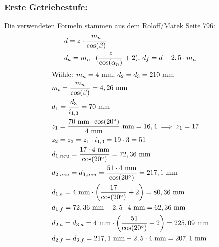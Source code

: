 \subsubsection{Erste Getriebestufe:}
Die verwendeten Formeln stammen aus dem Roloff/Matek Seite 796:
\begin{align*}
	&d= z \cdot \frac{m_n}{\cos(\beta)} \\
	&d_a = m_n \cdot (\frac{z}{\cos(\alpha_n)}+2)\text{, } d_f =d- 2,5 \cdot m_n
\end{align*}
\begin{align*}
	&\text{Wähle: } m_n= 4\text{ mm, } d_2 = d_3 = 210 \text{ mm} \\
	&m_t =  \frac{m_n}{\cos(\beta)} = 4,26 \text{ mm} \\
	&d_1 = \frac{d_3}{i_{1,3}} = 70 \text{ mm} \\
	&z_1 = \frac{70 \text{ mm} \cdot \cos(20^\circ)}{4 \text{ mm}} \text{ mm} = 16,4 \implies z_1 = 17\\
	&z_2=z_3 = z_1 \cdot i_{1,3} =19 \cdot 3 = 51 \\
	&d_{1,neu} = \frac{17 \cdot 4 \text{ mm}}{\cos(20^\circ)} = 72,36 \text{ mm} \\
	&d_{2,neu} = d_{3,neu} = \frac{51 \cdot 4 \text{ mm}}{\cos(20^\circ)} = 217,1 \text{ mm} \\
	&d_{1,a} = 4\text{ mm} \cdot \left(\frac{17}{\cos(20^\circ)}+2\right) =80,36\text{ mm} \\
	&d_{1,f} = 72,36\text{ mm} -2,5 \cdot 4\text{ mm} =62,36\text{ mm} \\
	&d_{2,a} = d_{3,a} =4\text{ mm} \cdot \left(\frac{51}{\cos(20^\circ)}+2\right) =225,09\text{ mm} \\
	&d_{2,f} =d_{3,f} = 217,1\text{ mm} -2,5 \cdot 4\text{ mm} =207,1\text{ mm} 
\end{align*}
